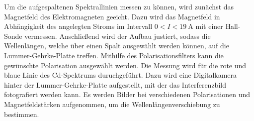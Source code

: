 Um die aufgespaltenen Spektrallinien messen zu können, wird zunächst das Magnetfeld des
Elektromagneten geeicht. Dazu wird das Magnetfeld in Abhängigkeit des angelegten Stroms
im Intervall $0<I<\SI{19}{\A}$ mit einer Hall-Sonde vermessen. Anschließend wird der
Aufbau justiert, sodass die Wellenlängen, welche über einen Spalt ausgewählt werden können, auf
die Lummer-Gehrke-Platte treffen. Mithilfe des Polarisationsfilters kann die
gewünschte Polarisation ausgewählt werden.
Die Messung wird für die rote und blaue Linie des Cd-Spektrums duruchgeführt. Dazu wird
eine Digitalkamera hinter der Lummer-Gehrke-Platte aufgestellt, mit der das Interferenzbild
fotografiert werden kann. Es werden Bilder bei verschiedenen Polarisationen und
Magnetfeldstärken aufgenommen, um die Wellenlängenverschiebung zu bestimmen.
